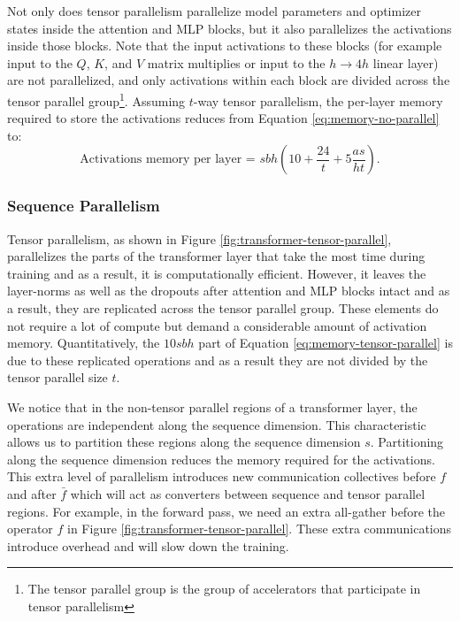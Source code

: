 \documentclass{article}
\begin{document}
Not only does tensor parallelism parallelize model parameters and optimizer states inside the attention and MLP blocks, but it also parallelizes the activations inside those blocks. Note that the input activations to these blocks (for example input to the $Q$, $K$, and $V$ matrix multiplies or input to the $h \rightarrow 4h$ linear layer) are not parallelized, and only activations within each block are divided across the tensor parallel group\footnote{The tensor parallel group is the group of accelerators that participate in tensor parallelism}. Assuming $t$-way tensor parallelism, the per-layer memory required to store the activations reduces from Equation \ref{eq:memory-no-parallel} to:
\begin{equation}
    \text{Activations memory per layer = } sbh \left(10 + \frac{24}{t} + 5 \frac{as}{ht}\right).
    \label{eq:memory-tensor-parallel}
\end{equation}


\subsubsection{Sequence Parallelism}
\label{sec:seq-parallel}

Tensor parallelism, as shown in Figure \ref{fig:transformer-tensor-parallel}, parallelizes the parts of the transformer layer that take the most time during training and as a result, it is computationally efficient. However, it leaves the layer-norms as well as the dropouts after attention and MLP blocks intact and as a result, they are replicated across the tensor parallel group. These elements do not require a lot of compute but demand a considerable amount of activation memory. Quantitatively, the $10sbh$ part of Equation \ref{eq:memory-tensor-parallel} is due to these replicated operations and as a result they are not divided by the tensor parallel size $t$.

We notice that in the non-tensor parallel regions of a transformer layer, the operations are independent along the sequence dimension. This characteristic allows us to partition these regions along the sequence dimension $s$. Partitioning along the sequence dimension reduces the memory required for the activations. This extra level of parallelism introduces new communication collectives before $f$ and after $\bar{f}$ which will act as converters between sequence and tensor parallel regions. For example, in the forward pass, we need an extra all-gather before the operator $f$ in Figure \ref{fig:transformer-tensor-parallel}. These extra communications introduce overhead and will slow down the training. 
\end{document}
